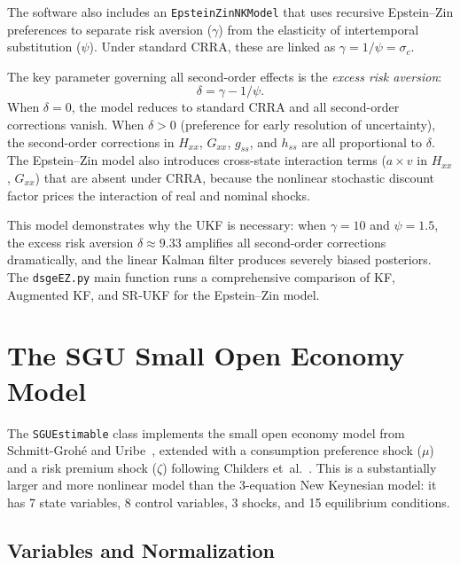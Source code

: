 \documentclass[11pt,a4paper]{article}
\theoremstyle{definition}
\newcommand{\code}[1]{\texttt{\color{codecolor}#1}}
\begin{document}
	The software also includes an \code{EpsteinZinNKModel} that uses recursive Epstein--Zin preferences to separate risk aversion ($\gamma$) from the elasticity of intertemporal substitution ($\psi$).
	Under standard CRRA, these are linked as $\gamma = 1/\psi = \sigma_c$.
	
	The key parameter governing all second-order effects is the \emph{excess risk aversion}:
	\begin{equation}\label{eq:delta_ez}
		\delta = \gamma - 1/\psi.
	\end{equation}
	When $\delta = 0$, the model reduces to standard CRRA and all second-order corrections vanish.
	When $\delta > 0$ (preference for early resolution of uncertainty), the second-order corrections in $H_{xx}$, $G_{xx}$, $g_{ss}$, and $h_{ss}$ are all proportional to $\delta$.
	The Epstein--Zin model also introduces cross-state interaction terms ($a \times v$ in $H_{xx}$, $G_{xx}$) that are absent under CRRA, because the nonlinear stochastic discount factor prices the interaction of real and nominal shocks.
	
	This model demonstrates why the UKF is necessary: when $\gamma = 10$ and $\psi = 1.5$, the excess risk aversion $\delta \approx 9.33$ amplifies all second-order corrections dramatically, and the linear Kalman filter produces severely biased posteriors.
	The \code{dsgeEZ.py} main function runs a comprehensive comparison of KF, Augmented KF, and SR-UKF for the Epstein--Zin model.
	

	\section{The SGU Small Open Economy Model}
	\label{sec:sgu_model}

	The \code{SGUEstimable} class implements the small open economy model from Schmitt-Groh\'{e} and Uribe~\cite{sgu2003}, extended with a consumption preference shock ($\mu$) and a risk premium shock ($\zeta$) following Childers et~al.~\cite{childers2024}.
	This is a substantially larger and more nonlinear model than the 3-equation New Keynesian model: it has 7 state variables, 8 control variables, 3 shocks, and 15 equilibrium conditions.

	\subsection{Variables and Normalization}
	\label{sec:sgu_variables}
\end{document}
